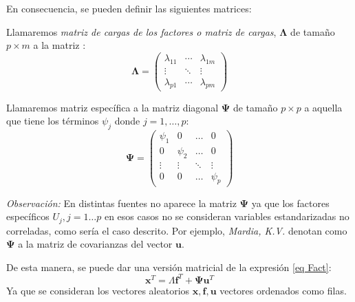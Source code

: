\noindent En consecuencia, se pueden definir las siguientes matrices: 

\begin{defi}
Llamaremos \emph{matriz de cargas de los factores o matriz de cargas}, $\mathbf{\Lambda}$ de tamaño $p \times m$ a la matriz :
\begin{equation}
\mathbf{\Lambda}=\begin{pmatrix}
\lambda_{11} & \cdots & \lambda_{1 m}\\
\vdots & \ddots & \vdots\\
\lambda_{p1} & \cdots & \lambda_{pm}
\end{pmatrix}
\end{equation}
\end{defi}

\begin{defi}
Llamaremos matriz específica a la matriz diagonal $\mathbf{\Psi}$ de tamaño $p\times p$ a aquella que tiene los términos $\psi_j$ donde $j=1,\ldots , p$:
\begin{equation}
\mathbf{\Psi}=\begin{pmatrix}
    \psi_1 & 0 & \dots & 0 \\
    0 & \psi_2 & \dots & 0 \\
    \vdots & \vdots & \ddots & \vdots \\
    0 & 0 & \dots & \psi_p
\end{pmatrix}
\end{equation}
\end{defi}

\noindent \emph{Observación:} En distintas fuentes no aparece la matriz $\mathbf{\Psi}$ ya que los factores específicos $U_j, j=1\ldots p$ en esos casos no se consideran variables estandarizadas no correladas, como sería el caso descrito. Por ejemplo,  \emph{Mardia, K.V.} \cite{Mardia 1979} denotan como $\mathbf{\Psi}$ a la matriz de covarianzas del vector $\mathbf{u}$.

\noindent De esta manera, se puede dar una versión matricial de la expresión \ref{eq Fact}:
\begin{equation}
\mathbf{x}^T=\Lambda \mathbf{f}^T+ \mathbf{\Psi}\mathbf{u}^T
\end{equation}
Ya que se consideran los vectores aleatorios $\mathbf{x}, \mathbf{f}, \mathbf{u}$ vectores ordenados como filas. 

